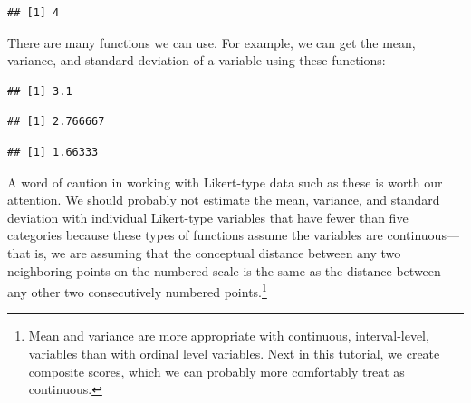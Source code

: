 \documentclass[
]{article}
\newenvironment{Shaded}{\begin{snugshade}}{\end{snugshade}}
\newcommand{\KeywordTok}[1]{\textcolor[rgb]{0.13,0.29,0.53}{\textbf{#1}}}
\newcommand{\NormalTok}[1]{#1}
\newcommand{\OperatorTok}[1]{\textcolor[rgb]{0.81,0.36,0.00}{\textbf{#1}}}
\begin{document}
\begin{verbatim}
## [1] 4
\end{verbatim}

There are many functions we can use. For example, we can get the mean, variance, and standard deviation of a variable using these functions:

\begin{Shaded}
\end{Shaded}

\begin{verbatim}
## [1] 3.1
\end{verbatim}

\begin{Shaded}
\end{Shaded}

\begin{verbatim}
## [1] 2.766667
\end{verbatim}

\begin{Shaded}
\end{Shaded}

\begin{verbatim}
## [1] 1.66333
\end{verbatim}

A word of caution in working with Likert-type data such as these is worth our attention. We should probably not estimate the mean, variance, and standard deviation with individual Likert-type variables that have fewer than five categories because these types of functions assume the variables are continuous---that is, we are assuming that the conceptual distance between any two neighboring points on the numbered scale is the same as the distance between any other two consecutively numbered points.\footnote{Mean and variance are more appropriate with continuous, interval-level, variables than with ordinal level variables. Next in this tutorial, we create composite scores, which we can probably more comfortably treat as continuous.}
\end{document}
